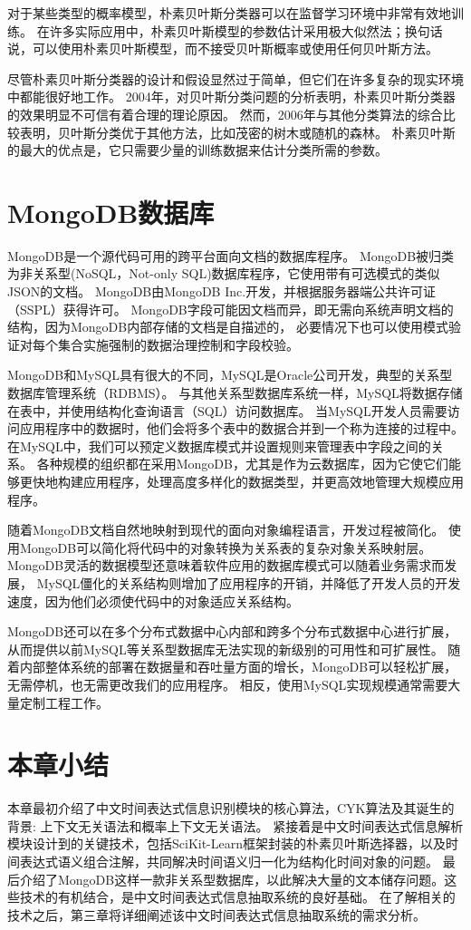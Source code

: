 对于某些类型的概率模型，朴素贝叶斯分类器可以在监督学习环境中非常有效地训练。
在许多实际应用中，朴素贝叶斯模型的参数估计采用极大似然法；换句话说，可以使用朴素贝叶斯模型，而不接受贝叶斯概率或使用任何贝叶斯方法\cite{hand2007idiot}。

尽管朴素贝叶斯分类器的设计和假设显然过于简单，但它们在许多复杂的现实环境中都能很好地工作。
2004年，对贝叶斯分类问题的分析表明，朴素贝叶斯分类器的效果明显不可信有着合理的理论原因。
然而，2006年与其他分类算法的综合比较表明，贝叶斯分类优于其他方法，比如茂密的树木或随机的森林。
朴素贝叶斯的最大的优点是，它只需要少量的训练数据来估计分类所需的参数\cite{10.1145/1143844.1143865}。

\section{MongoDB数据库}

MongoDB是一个源代码可用的跨平台面向文档的数据库程序。
MongoDB被归类为非关系型(NoSQL，Not-only SQL)数据库程序，它使用带有可选模式的类似JSON的文档。
MongoDB由MongoDB Inc.开发，并根据服务器端公共许可证（SSPL）获得许可。
MongoDB字段可能因文档而异，即无需向系统声明文档的结构，因为MongoDB内部存储的文档是自描述的，
必要情况下也可以使用模式验证对每个集合实施强制的数据治理控制和字段校验。

MongoDB和MySQL具有很大的不同\cite{Győrödi2015comparative}，MySQL是Oracle公司开发，典型的关系型数据库管理系统（RDBMS）。
与其他关系型数据库系统一样，MySQL将数据存储在表中，并使用结构化查询语言（SQL）访问数据库。
当MySQL开发人员需要访问应用程序中的数据时，他们会将多个表中的数据合并到一个称为连接的过程中。
在MySQL中，我们可以预定义数据库模式并设置规则来管理表中字段之间的关系。
各种规模的组织都在采用MongoDB，尤其是作为云数据库，因为它使它们能够更快地构建应用程序，处理高度多样化的数据类型，并更高效地管理大规模应用程序。

随着MongoDB文档自然地映射到现代的面向对象编程语言，开发过程被简化。
使用MongoDB可以简化将代码中的对象转换为关系表的复杂对象关系映射层。
MongoDB灵活的数据模型还意味着软件应用的数据库模式可以随着业务需求而发展，
MySQL僵化的关系结构则增加了应用程序的开销，并降低了开发人员的开发速度，因为他们必须使代码中的对象适应关系结构。

MongoDB还可以在多个分布式数据中心内部和跨多个分布式数据中心进行扩展，从而提供以前MySQL等关系型数据库无法实现的新级别的可用性和可扩展性。
随着内部整体系统的部署在数据量和吞吐量方面的增长，MongoDB可以轻松扩展，无需停机，也无需更改我们的应用程序。
相反，使用MySQL实现规模通常需要大量定制工程工作。

\section{本章小结}

本章最初介绍了中文时间表达式信息识别模块的核心算法，CYK算法及其诞生的背景: 上下文无关语法和概率上下文无关语法。
紧接着是中文时间表达式信息解析模块设计到的关键技术，包括SciKit-Learn框架封装的朴素贝叶斯选择器，以及时间表达式语义组合注解，共同解决时间语义归一化为结构化时间对象的问题。
最后介绍了MongoDB这样一款非关系型数据库，以此解决大量的文本储存问题。这些技术的有机结合，是中文时间表达式信息抽取系统的良好基础。
在了解相关的技术之后，第三章将详细阐述该中文时间表达式信息抽取系统的需求分析。

